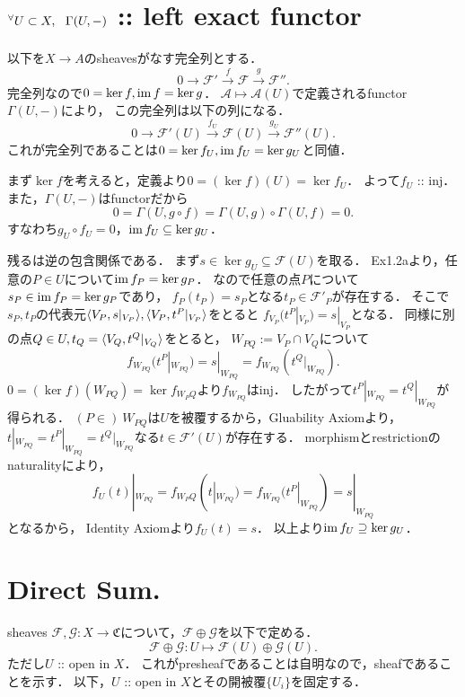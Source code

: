 \documentclass[a4paper]{jsarticle}
\newcommand{\shA}{\mathcal{A}}
\newcommand{\shF}{\mathcal{F}}
\newcommand{\shG}{\mathcal{G}}
\begin{document}
\section{${}^{\forall} U \subset X,~~ \Gamma(U,-)$ :: left exact functor} %
    以下を$X \to A$のsheavesがなす完全列とする．
    \[ 0 \to \shF' \xrightarrow{f} \shF \xrightarrow{g} \shF''. \]
    完全列なので$0=\ker f, \operatorname{im} f=\ker g$．
    $\shA \mapsto \shA(U)$で定義されるfunctor $\Gamma(U,-)$により，
    この完全列は以下の列になる．
    \[ 0 \to \shF'(U) \xrightarrow{f_U} \shF(U) \xrightarrow{g_U} \shF''(U). \]
    これが完全列であることは$0=\ker f_U, \operatorname{im} f_U=\ker g_U$と同値．

    まず$\ker f$を考えると，定義より$0=(\ker f)(U)=\ker f_U$．
    よって$f_U$ :: inj．
    また，$\Gamma(U,-)$はfunctorだから
    \[ 0=\Gamma(U,g \circ f)=\Gamma(U,g) \circ \Gamma(U,f)=0. \]
    すなわち$g_U \circ f_U=0$，$\operatorname{im} f_U \subseteq \ker g_U$．

    残るは逆の包含関係である．
    まず$s \in \ker g_U \subseteq \shF(U)$を取る．
    Ex1.2aより，任意の$P \in U$について$\operatorname{im} f_P=\ker g_P$．
    なので任意の点$P$について$s_P \in \operatorname{im} f_P=\ker g_P$であり，
    $f_P(t_P)=s_P$となる$t_P \in \shF'_P$が存在する．
    そこで$s_P,t_P$の代表元$\langle V_P,s|_{V_P} \rangle, \langle V_P,t^P|_{V_P} \rangle$をとると
    $f_{V_P}(t^P|_{V_P})=s|_{V_P}$となる．
    同様に別の点$Q \in U, t_Q=\langle V_Q,t^Q|_{V_Q} \rangle$をとると，
    $W_{PQ}:=V_P \cap V_Q$について
    \[ f_{W_{PQ}}(t^P|_{W_{PQ}})=s|_{W_{PQ}}=f_{W_{PQ}}(t^Q|_{W_{PQ}}). \]
    $0=(\ker f)(W_{PQ})=\ker f_{W_PQ}$より$f_{W_{PQ}}$はinj．
    したがって$t^P|_{W_{PQ}}=t^Q|_{W_{PQ}}$が得られる．
    $(P \in)~W_{PQ}$は$U$を被覆するから，Gluability Axiomより，
    $t|_{W_{PQ}}=t^P|_{W_{PQ}}=t^Q|_{W_{PQ}}$なる$t \in \shF'(U)$が存在する．
    morphismとrestrictionのnaturalityにより，
    \[ f_{U}(t)|_{W_{PQ}}=f_{W_PQ}(t|_{W_{PQ}})=f_{W_{PQ}}(t^P|_{W_{PQ}})=s|_{W_{PQ}} \]となるから，
    Identity Axiomより$f_{U}(t)=s$．
    以上より$\operatorname{im} f_U \supseteq \ker g_U$．

\section{Direct Sum.} %
    sheaves $\shF,\shG: X \to \mathfrak{C}$について，$\shF \oplus \shG$を以下で定める．
    \[ \shF \oplus \shG: U \mapsto \shF(U) \oplus \shG(U). \]
    ただし$U$ :: open in $X$．
    これがpresheafであることは自明なので，sheafであることを示す．
    以下，$U$ :: open in $X$とその開被覆$\{U_i\}$を固定する．
\end{document}
